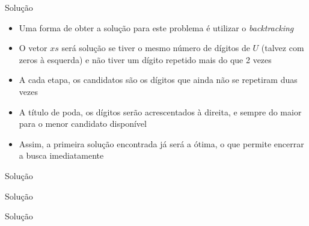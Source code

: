 \begin{frame}[fragile]{Solução}

    \begin{itemize}
        \item Uma forma de obter a solução para este problema é utilizar o \textit{backtracking}

        \item O vetor $xs$ será solução se tiver o mesmo número de dígitos de $U$ (talvez com
            zeros à esquerda) e não tiver um dígito repetido mais do que 2 vezes

        \item A cada etapa, os candidatos são os dígitos que ainda não se repetiram duas vezes

        \item A título de poda, os dígitos serão acrescentados à direita, e sempre do maior
            para o menor candidato disponível
            
        \item Assim, a primeira solução encontrada já será a ótima, o que permite encerrar a
            busca imediatamente
   \end{itemize}

\end{frame}

\begin{frame}[fragile]{Solução}
\end{frame}

\begin{frame}[fragile]{Solução}
\end{frame}

\begin{frame}[fragile]{Solução}
\end{frame}
